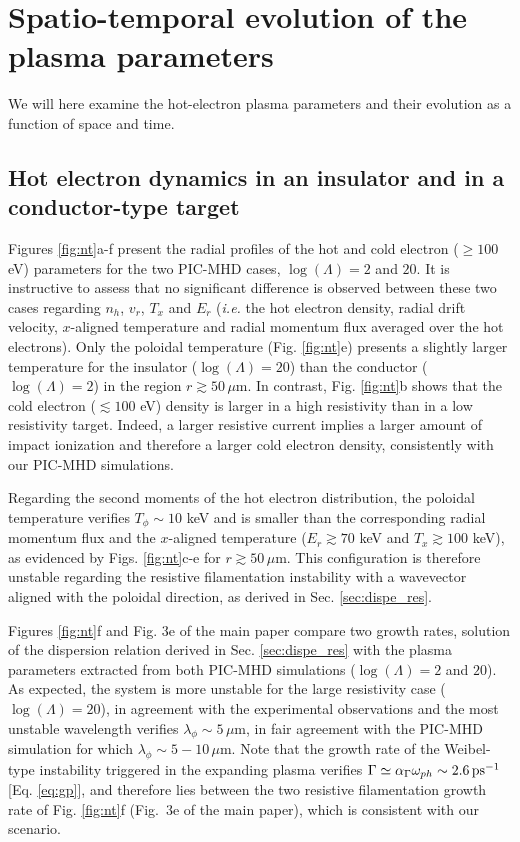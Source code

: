 \documentclass[aps,showpacs,superscriptaddress]{revtex4}
\begin{document}
\section{Spatio-temporal evolution of the plasma parameters}
We will here examine the hot-electron plasma parameters and their evolution as a function of space and time. 

\subsection{Hot electron dynamics in an insulator and in a conductor-type target} 
Figures \ref{fig:nt}a-f present the radial profiles of the hot and cold electron ($\ge 100$ eV) parameters for the two PIC-MHD cases, $\log(\Lambda)=2$ and $20$. 
It is instructive to assess that no significant difference is observed between these two cases regarding $n_h$, $v_r$, $T_x$ and $E_r$ (\emph{i.e.} the hot electron density, radial drift velocity, $x$-aligned temperature and radial momentum flux averaged over the hot electrons). Only the poloidal temperature (Fig. \ref{fig:nt}e) presents a slightly larger temperature for the insulator ($\log(\Lambda)=20$)  than the conductor ($\log(\Lambda)=2$) in the region $r\gtrsim 50\, \mu$m. 
In contrast, Fig. \ref{fig:nt}b shows that the cold electron ($\lesssim 100$ eV) density is larger in a high resistivity than in a low resistivity target. Indeed, a larger resistive current implies a larger amount of impact ionization and therefore a larger cold electron density, consistently with our PIC-MHD simulations. 

Regarding the second moments of the hot electron distribution, 
the   poloidal  temperature verifies $T_\phi\sim 10$ keV and  is  smaller than the corresponding radial momentum flux and the $x$-aligned temperature ($E_r\gtrsim 70$ keV and $T_x\gtrsim 100$ keV),  as evidenced by Figs. \ref{fig:nt}c-e for $r\gtrsim 50\, \mu$m. This configuration is therefore unstable regarding the resistive filamentation instability with a wavevector aligned with the poloidal direction, as derived in Sec. \ref{sec:dispe_res}. 
 
Figures \ref{fig:nt}f and  Fig. 3e of the main paper compare two growth rates, solution of the dispersion relation derived in Sec. \ref{sec:dispe_res}  with the plasma parameters extracted from both PIC-MHD simulations ($\log(\Lambda)=2$ and $20$).
As expected, the system is more unstable for the large resistivity case ($\log(\Lambda)=20$), in agreement with the experimental observations and the  most unstable wavelength verifies $\lambda_\phi \sim 5\, \mu$m, in fair agreement with  the PIC-MHD simulation  for which $\lambda_\phi \sim 5-10\, \mu$m.
Note that the growth rate of the Weibel-type instability triggered in the expanding plasma verifies $\Gamma\simeq \alpha_\Gamma \omega_{ph}\sim 2.6\,\rm ps^{-1}$ [Eq. \eqref{eq:gp}], and therefore lies between the two resistive filamentation  growth rate  of Fig. \ref{fig:nt}f (Fig.~3e of the main paper), which is consistent with our scenario.
\end{document}
